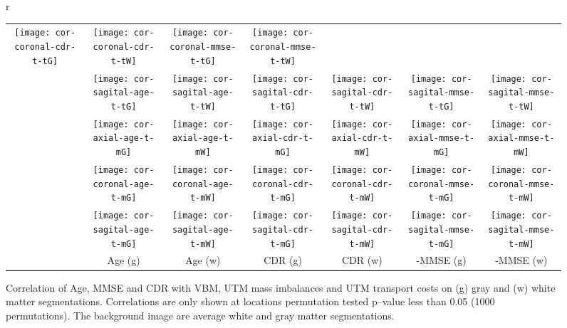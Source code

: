\documentclass{llncs}
\begin{document}
\begin{figure}[!h]
\begin{tabular}{r}
\begin{tabular}{c|cc||cc||cc}
\texttt{[image: cor-coronal-cdr-t-tG]} &
\texttt{[image: cor-coronal-cdr-t-tW]} &
\texttt{[image: cor-coronal-mmse-t-tG]} &
\texttt{[image: cor-coronal-mmse-t-tW]} \\ 
&
\texttt{[image: cor-sagital-age-t-tG]} &
\texttt{[image: cor-sagital-age-t-tW]} &
\texttt{[image: cor-sagital-cdr-t-tG]} &
\texttt{[image: cor-sagital-cdr-t-tW]} &
\texttt{[image: cor-sagital-mmse-t-tG]} &
\texttt{[image: cor-sagital-mmse-t-tW]} \\ 
  \hline 
  \hline
  \raisebox{1mm}{ \multirow{3}{4mm}{ \rotatebox[origin=c]{90}{UTM Mass Allocation} }} &
\texttt{[image: cor-axial-age-t-mG]} &
\texttt{[image: cor-axial-age-t-mW]} &
\texttt{[image: cor-axial-cdr-t-mG]} &
\texttt{[image: cor-axial-cdr-t-mW]} &
\texttt{[image: cor-axial-mmse-t-mG]} &
\texttt{[image: cor-axial-mmse-t-mW]} \\ 
        &
\texttt{[image: cor-coronal-age-t-mG]} &
\texttt{[image: cor-coronal-age-t-mW]} &
\texttt{[image: cor-coronal-cdr-t-mG]} &
\texttt{[image: cor-coronal-cdr-t-mW]} &
\texttt{[image: cor-coronal-mmse-t-mG]} &
\texttt{[image: cor-coronal-mmse-t-mW]} \\ 
        &
\texttt{[image: cor-sagital-age-t-mG]} &
\texttt{[image: cor-sagital-age-t-mW]} &
\texttt{[image: cor-sagital-cdr-t-mG]} &
\texttt{[image: cor-sagital-cdr-t-mW]} &
\texttt{[image: cor-sagital-mmse-t-mG]} &
\texttt{[image: cor-sagital-mmse-t-mW]} \\ 

\hline \hline
& \parbox[b][3mm]{12mm}{Age (g)} 
& \parbox[b][3mm]{12mm}{Age (w)} 
& \parbox[b][3mm]{15mm}{CDR (g)} 
& \parbox[b][3mm]{15mm}{CDR (w) }
& \parbox[b][3mm]{15mm}{-MMSE (g)}
& \parbox[b][3mm]{15mm}{-MMSE (w)}
\end{tabular}
\end{tabular}
\caption{\label{fig:cor-oasis}
Correlation of Age, MMSE and CDR with VBM, UTM mass imbalances and UTM
transport costs on (g) gray and (w) white matter segmentations.  Correlations
are only shown at locations permutation tested p--value less than 0.05 (1000
permutations). The background image are average white and gray matter
segmentations.
\vspace{-4.5mm}
} 
\end{figure} \endgroup
\end{document}
